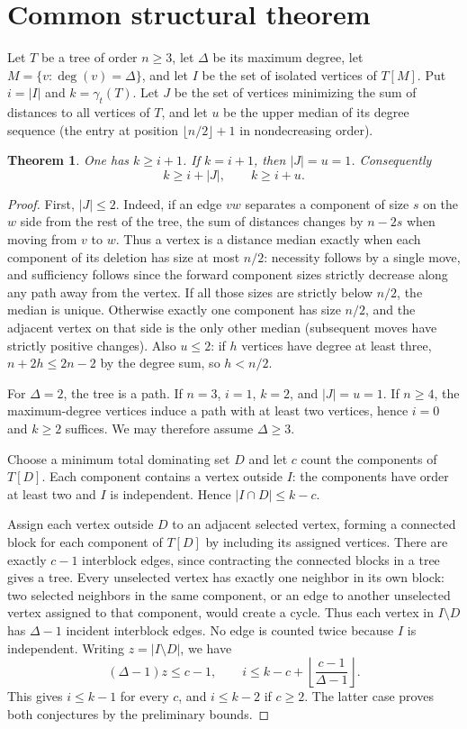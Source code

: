 \documentclass[11pt]{article}
\newtheorem{theorem}{Theorem}
\begin{document}
\section{Common structural theorem}
Let $T$ be a tree of order $n\ge3$, let $\Delta$ be its maximum degree, let $M=\{v:\deg(v)=\Delta\}$, and let $I$ be the set of isolated vertices of $T[M]$. Put $i=|I|$ and $k=\gamma_t(T)$. Let $J$ be the set of vertices minimizing the sum of distances to all vertices of $T$, and let $u$ be the upper median of its degree sequence (the entry at position $\lfloor n/2\rfloor+1$ in nondecreasing order).
\begin{theorem}
One has $k\ge i+1$. If $k=i+1$, then $|J|=u=1$. Consequently
\[
 k\ge i+|J|,\qquad k\ge i+u.
\]
\end{theorem}
\begin{proof}
First, $|J|\le2$. Indeed, if an edge $vw$ separates a component of size $s$ on the $w$ side from the rest of the tree, the sum of distances changes by $n-2s$ when moving from $v$ to $w$. Thus a vertex is a distance median exactly when each component of its deletion has size at most $n/2$: necessity follows by a single move, and sufficiency follows since the forward component sizes strictly decrease along any path away from the vertex. If all those sizes are strictly below $n/2$, the median is unique. Otherwise exactly one component has size $n/2$, and the adjacent vertex on that side is the only other median (subsequent moves have strictly positive changes). Also $u\le2$: if $h$ vertices have degree at least three, $n+2h\le 2n-2$ by the degree sum, so $h<n/2$.

For $\Delta=2$, the tree is a path. If $n=3$, $i=1$, $k=2$, and $|J|=u=1$. If $n\ge4$, the maximum-degree vertices induce a path with at least two vertices, hence $i=0$ and $k\ge2$ suffices. We may therefore assume $\Delta\ge3$.

Choose a minimum total dominating set $D$ and let $c$ count the components of $T[D]$. Each component contains a vertex outside $I$: the components have order at least two and $I$ is independent. Hence $|I\cap D|\le k-c$.

Assign each vertex outside $D$ to an adjacent selected vertex, forming a connected block for each component of $T[D]$ by including its assigned vertices. There are exactly $c-1$ interblock edges, since contracting the connected blocks in a tree gives a tree. Every unselected vertex has exactly one neighbor in its own block: two selected neighbors in the same component, or an edge to another unselected vertex assigned to that component, would create a cycle. Thus each vertex in $I\setminus D$ has $\Delta-1$ incident interblock edges. No edge is counted twice because $I$ is independent. Writing $z=|I\setminus D|$, we have
\[
 (\Delta-1)z\le c-1,\qquad
 i\le k-c+\left\lfloor\frac{c-1}{\Delta-1}\right\rfloor.
\]
This gives $i\le k-1$ for every $c$, and $i\le k-2$ if $c\ge2$. The latter case proves both conjectures by the preliminary bounds.


\end{proof}
\end{document}
